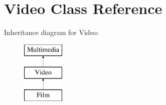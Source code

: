 \hypertarget{class_video}{\section{Video Class Reference}
\label{class_video}
}
Inheritance diagram for Video\-:\begin{figure}[H]
\begin{center}
\leavevmode
\includegraphics[height=3.000000cm]{class_video}
\end{center}
\end{figure}
